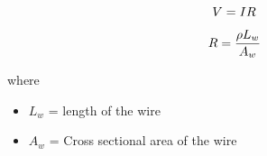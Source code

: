 \documentclass{article}
\begin{document}
\begin{equation}
\Huge {V} = {I}{R}
\end{equation}

\vspace{0.5cm} %
\begin{equation}
\Huge \Huge R = \frac{\rho L_w}{A_w}
\end{equation}

\vspace{0.5cm} %


\huge
where
\begin{itemize}
    \item \( L_w \) = length of the wire
    \item \( A_w\) = Cross sectional area of the wire
\end{itemize}
\end{document}
